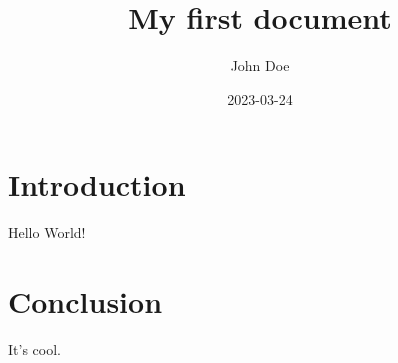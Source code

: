 \documentclass{article}
\title{My first document}
\date{2023-03-24}
\author{John Doe}
\begin{document}
  \maketitle 
  
  \section{Introduction}
  Hello World!

  \section{Conclusion}
  It's cool.
  
\end{document}
